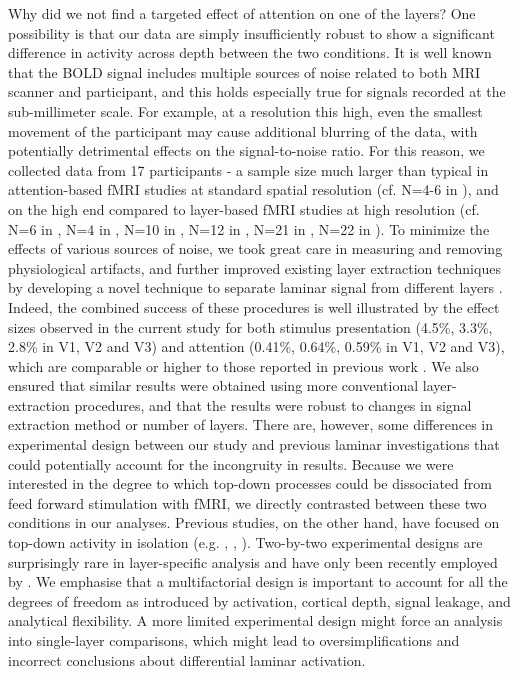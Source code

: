 \documentclass[9pt,lineno]{aperture}
\begin{document}
Why did we not find a targeted effect of attention on one of the layers? One possibility is that our data are simply insufficiently robust to show a significant difference in activity across depth between the two conditions. It is well known that the BOLD signal includes multiple sources of noise related to both MRI scanner and participant, and this holds especially true for signals recorded at the sub-millimeter scale. For example, at a resolution this high, even the smallest movement of the participant may cause additional blurring of the data, with potentially detrimental effects on the signal-to-noise ratio. For this reason, we collected data from 17 participants - a sample size much larger than typical in attention-based fMRI studies at standard spatial resolution (cf. N=4-6 in \citet{Kastner1999,Kamitani2005,Jehee2011}), and on the high end compared to layer-based fMRI studies at high resolution (cf. N=6 in \citet{Polimeni2010}, N=4 in \citet{Muckli2015}, N=10 in \citet{Kok2016}, N=12 in \citep{Klein2018}, N=21 in \citep{Lawrence2018}, N=22 in \citep{Sharoh2019}). To minimize the effects of various sources of noise, we took great care in measuring and removing physiological artifacts, and further improved existing layer extraction techniques by developing a novel technique to separate laminar signal from different layers \cite{VanMourik2019}. Indeed, the combined success of these procedures is well illustrated by the effect sizes observed in the current study for both stimulus presentation (4.5\%, 3.3\%, 2.8\% in V1, V2 and V3) and attention (0.41\%, 0.64\%, 0.59\% in V1, V2 and V3), which are comparable or higher to those reported in previous work \citet{Murray2008,Jehee2011}. We also ensured that similar results were obtained using more conventional layer-extraction procedures, and that the results were robust to changes in signal extraction method or number of layers. 
There are, however, some differences in experimental design between our study and previous laminar investigations that could potentially account for the incongruity in results. Because we were interested in the degree to which top-down processes could be dissociated from feed forward stimulation with fMRI, we directly contrasted between these two conditions in our analyses. Previous studies, on the other hand, have focused on top-down activity in isolation (e.g. \citet{Muckli2015}, \citet{Kok2016}, \citet{Lawrence2018}). Two-by-two experimental designs are surprisingly rare in layer-specific analysis and have only been recently employed by \citet{DeHollander2020}. We emphasise that a multifactorial design is important to account for all the degrees of freedom as introduced by activation, cortical depth, signal leakage, and analytical flexibility. A more limited experimental design might force an analysis into single-layer comparisons, which might lead to oversimplifications and incorrect conclusions about differential laminar activation. 
\end{document}
